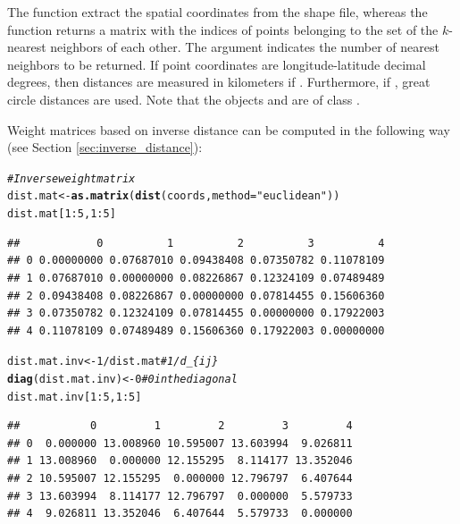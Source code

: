 \documentclass[english,12pt]{book}\usepackage[]{graphicx}\usepackage[]{xcolor}
\makeatletter
\newcommand{\hlnum}[1]{\textcolor[rgb]{0.686,0.059,0.569}{#1}}%
\newcommand{\hlstr}[1]{\textcolor[rgb]{0.192,0.494,0.8}{#1}}%
\newcommand{\hlcom}[1]{\textcolor[rgb]{0.678,0.584,0.686}{\textit{#1}}}%
\newcommand{\hlopt}[1]{\textcolor[rgb]{0,0,0}{#1}}%
\newcommand{\hlstd}[1]{\textcolor[rgb]{0.345,0.345,0.345}{#1}}%
\newcommand{\hlkwb}[1]{\textcolor[rgb]{0.69,0.353,0.396}{#1}}%
\newcommand{\hlkwc}[1]{\textcolor[rgb]{0.333,0.667,0.333}{#1}}%
\newcommand{\hlkwd}[1]{\textcolor[rgb]{0.737,0.353,0.396}{\textbf{#1}}}%
\newenvironment{kframe}{%
 \def\at@end@of@kframe{}%
 \ifinner\ifhmode%
  \def\at@end@of@kframe{\end{minipage}}%
  \begin{minipage}{\columnwidth}%
 \fi\fi%
 \def\FrameCommand##1{\hskip\@totalleftmargin \hskip-\fboxsep
 \colorbox{shadecolor}{##1}\hskip-\fboxsep
     \hskip-\linewidth \hskip-\@totalleftmargin \hskip\columnwidth}%
 \MakeFramed {\advance\hsize-\width
   \@totalleftmargin\z@ \linewidth\hsize
   \@setminipage}}%
 {\par\unskip\endMakeFramed%
 \at@end@of@kframe}
\newenvironment{knitrout}{}{} %
\makeatother
\begin{document}
The function  extract the spatial coordinates from the shape file, whereas the function  returns a matrix with the indices of points belonging to the set of the $k$-nearest neighbors of each other. The argument  indicates the number of nearest neighbors to be returned. If point coordinates are longitude-latitude decimal degrees, then distances are measured in kilometers if . Furthermore, if , great circle distances are used. Note that the objects  and  are of class .

Weight matrices based on inverse distance can be computed in the following way (see Section \ref{sec:inverse_distance}):

\begin{knitrout}
\color{fgcolor}\begin{kframe}
\begin{alltt}
\hlcom{# Inverse weight matrix}
\hlstd{dist.mat} \hlkwb{<-} \hlkwd{as.matrix}\hlstd{(}\hlkwd{dist}\hlstd{(coords,} \hlkwc{method} \hlstd{=} \hlstr{"euclidean"}\hlstd{))}
\hlstd{dist.mat[}\hlnum{1}\hlopt{:}\hlnum{5}\hlstd{,} \hlnum{1}\hlopt{:}\hlnum{5}\hlstd{]}
\end{alltt}
\begin{verbatim}
##            0          1          2          3          4
## 0 0.00000000 0.07687010 0.09438408 0.07350782 0.11078109
## 1 0.07687010 0.00000000 0.08226867 0.12324109 0.07489489
## 2 0.09438408 0.08226867 0.00000000 0.07814455 0.15606360
## 3 0.07350782 0.12324109 0.07814455 0.00000000 0.17922003
## 4 0.11078109 0.07489489 0.15606360 0.17922003 0.00000000
\end{verbatim}
\begin{alltt}
\hlstd{dist.mat.inv} \hlkwb{<-} \hlnum{1} \hlopt{/} \hlstd{dist.mat} \hlcom{# 1 / d_\{ij\}}
\hlkwd{diag}\hlstd{(dist.mat.inv)} \hlkwb{<-} \hlnum{0}      \hlcom{# 0 in the diagonal}
\hlstd{dist.mat.inv[}\hlnum{1}\hlopt{:}\hlnum{5}\hlstd{,} \hlnum{1}\hlopt{:}\hlnum{5}\hlstd{]}
\end{alltt}
\begin{verbatim}
##           0         1         2         3         4
## 0  0.000000 13.008960 10.595007 13.603994  9.026811
## 1 13.008960  0.000000 12.155295  8.114177 13.352046
## 2 10.595007 12.155295  0.000000 12.796797  6.407644
## 3 13.603994  8.114177 12.796797  0.000000  5.579733
## 4  9.026811 13.352046  6.407644  5.579733  0.000000
\end{verbatim}

\end{kframe}
\end{knitrout}
\end{document}
